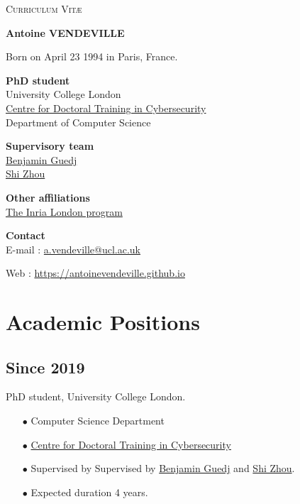 \documentclass[a4paper,10pt]{article}
\begin{document}
\bigskip
\begin{center}
\LARGE\textsc{Curriculum Vit\ae}

\medskip

\end{center}
\bigskip

\bigskip
\bigskip

\thispagestyle{empty} %
 
{\large\textbf{Antoine VENDEVILLE}}
\vspace{1cm}

Born on April 23 1994 in Paris, France.

\medskip

\textbf{PhD student}\\ 
University College London\\
\href{https://www.ucl.ac.uk/cybersecurity-cdt/}{Centre for Doctoral Training in Cybersecurity}\\
Department of Computer Science

\medskip
\textbf{Supervisory team}\\
\href{https://bguedj.github.io/}{Benjamin Guedj}\\
\href{https://wp.cs.ucl.ac.uk/shizhou/}{Shi Zhou}

\medskip

\textbf{Other affiliations}\\
\href{https://www.inria.fr/en/inria-london-programme-bringing-france-and-uk-closer-together-through-research}{The Inria London program}

\medskip

\textbf{Contact}\\
  E-mail :
  \href{mailto:a.vendeville@ucl.ac.uk}{a.vendeville@ucl.ac.uk}
  
  Web : \url{https://antoinevendeville.github.io}


\renewcommand{\baselinestretch}{1.0}

\section*{Academic Positions}
\subsection*{Since 2019} 
PhD student, University College London. 
\begin{itemize}
	\item[$\bullet$] Computer Science Department
	\item[$\bullet$]\href{https://www.ucl.ac.uk/computer-science/study/postgraduate-research/centre-doctoral-training-cybersecurity}{Centre for Doctoral Training in Cybersecurity}
	\item[$\bullet$] Supervised by Supervised by \href{https://bguedj.github.io/}{Benjamin Guedj} and \href{https://wp.cs.ucl.ac.uk/shizhou/}{Shi Zhou}.
	\item[$\bullet$] Expected duration 4 years.
\end{itemize}
\end{document}
